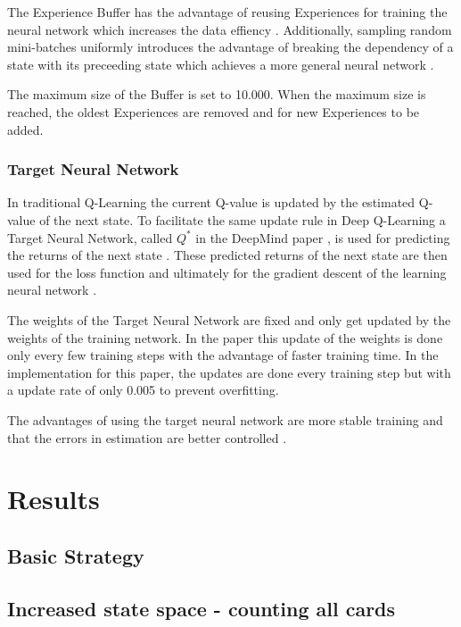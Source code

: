 \documentclass[conference]{IEEEtran}
\begin{document}
The Experience Buffer has the advantage of reusing Experiences for training the neural network which increases the data effiency \cite{b2}.
Additionally, sampling random mini-batches uniformly introduces the advantage of breaking the dependency of a state with its preceeding state which achieves a more general neural network \cite{b2}. 

The maximum size of the Buffer is set to 10.000.
When the maximum size is reached, the oldest Experiences are removed and for new Experiences to be added. 

\subsubsection{Target Neural Network} \label{target-network}
In traditional Q-Learning the current Q-value is updated by the estimated Q-value of the next state.
To facilitate the same update rule in Deep Q-Learning a Target Neural Network, called $Q^*$ in the DeepMind paper \cite{b2}, is used for predicting the returns of the next state \cite{b6}.
These predicted returns of the next state are then used for the loss function and ultimately for the gradient descent of the learning neural network \cite{b6}. 

The weights of the Target Neural Network are fixed and only get updated by the weights of the training network. 
In the paper \cite{b6} this update of the weights is done only every few training steps with the advantage of faster training time. 
In the implementation for this paper, the updates are done every training step but with a update rate of only 0.005 to prevent overfitting.

The advantages of using the target neural network are more stable training and that the errors in estimation are better controlled \cite{b6}.



\section{Results}

\subsection{Basic Strategy}

\subsection{Increased state space - counting all cards}
\end{document}
